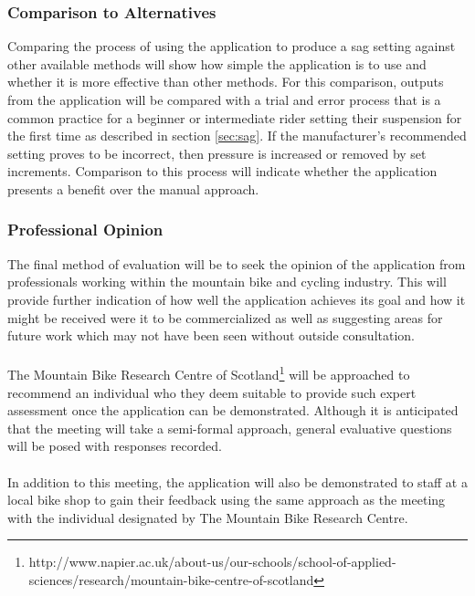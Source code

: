 		\subsubsection{Comparison to Alternatives}\label{sec:methodology_manual}
			Comparing the process of using the application to produce a sag setting against other available methods will show how simple the application is to use and whether it is more effective than other methods. For this comparison, outputs from the application will be compared with a trial and error process that is a common practice for a beginner or intermediate rider setting their suspension for the first time as described in section \ref{sec:sag}. If the manufacturer's recommended setting proves to be incorrect, then pressure is increased or removed by set increments. Comparison to this process will indicate whether the application presents a benefit over the manual approach.
		\subsubsection{Professional Opinion}\label{sec:methodology_professional_opinion}
			The final method of evaluation will be to seek the opinion of the application from professionals working within the mountain bike and cycling industry. This will provide further indication of how well the application achieves its goal and how it might be received were it to be commercialized as well as suggesting areas for future work which may not have been seen without outside consultation.
			\\\\
			The Mountain Bike Research Centre of Scotland\footnote{http://www.napier.ac.uk/about-us/our-schools/school-of-applied-sciences/research/mountain-bike-centre-of-scotland} will be approached to recommend an individual who they deem suitable to provide such expert assessment once the application can be demonstrated. Although it is anticipated that the meeting will take a semi-formal approach, general evaluative questions will be posed with responses recorded. 
			\\\\
			In addition to this meeting, the application will also be demonstrated to staff at a local bike shop to gain their feedback using the same approach as the meeting with the individual designated by The Mountain Bike Research Centre.